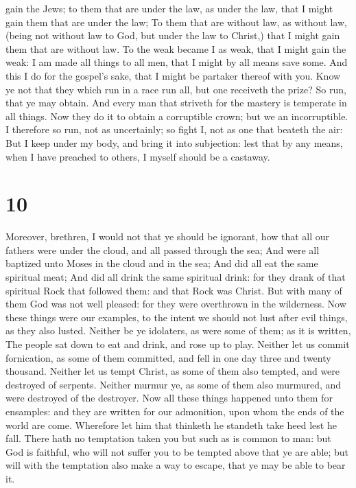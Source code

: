 gain the Jews; to them that are under the law, as under the law, that I
might gain them that are under the law;  To them that are
without law, as without law, (being not without law to God, but under
the law to Christ,) that I might gain them that are without law.
 To the weak became I as weak, that I might gain the
weak: I am made all things to all men, that I might by all means save
some.  And this I do for the gospel's sake, that I might
be partaker thereof with you.  Know ye not that they
which run in a race run all, but one receiveth the prize? So run, that
ye may obtain.  And every man that striveth for the
mastery is temperate in all things. Now they do it to obtain a
corruptible crown; but we an incorruptible.  I therefore
so run, not as uncertainly; so fight I, not as one that beateth the air:
 But I keep under my body, and bring it into subjection:
lest that by any means, when I have preached to others, I myself should
be a castaway.

\hypertarget{section-9}{%
\section{10}\label{section-9}}

 Moreover, brethren, I would not that ye should be
ignorant, how that all our fathers were under the cloud, and all passed
through the sea;  And were all baptized unto Moses in the
cloud and in the sea;  And did all eat the same spiritual
meat;  And did all drink the same spiritual drink: for
they drank of that spiritual Rock that followed them: and that Rock was
Christ.  But with many of them God was not well pleased:
for they were overthrown in the wilderness.  Now these
things were our examples, to the intent we should not lust after evil
things, as they also lusted.  Neither be ye idolaters, as
were some of them; as it is written, The people sat down to eat and
drink, and rose up to play.  Neither let us commit
fornication, as some of them committed, and fell in one day three and
twenty thousand.  Neither let us tempt Christ, as some of
them also tempted, and were destroyed of serpents. 
Neither murmur ye, as some of them also murmured, and were destroyed of
the destroyer.  Now all these things happened unto them
for ensamples: and they are written for our admonition, upon whom the
ends of the world are come.  Wherefore let him that
thinketh he standeth take heed lest he fall.  There hath
no temptation taken you but such as is common to man: but God is
faithful, who will not suffer you to be tempted above that ye are able;
but will with the temptation also make a way to escape, that ye may be
able to bear it.

